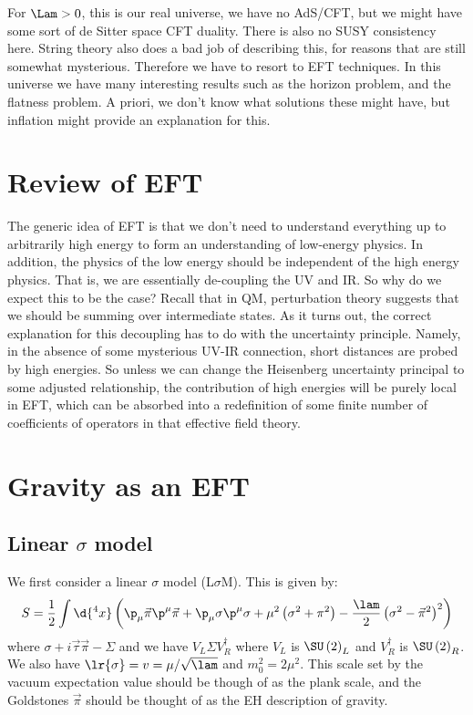 \documentclass{booc}
\begin{document}
For $\Lam > 0$, this is our real universe, we have no AdS/CFT, but we might have some sort
of de Sitter space CFT duality. There is also no SUSY consistency here. 
String theory also does a bad job of describing this, for reasons that are still
somewhat mysterious. 
Therefore we have to resort to EFT techniques. 
In this universe we have many interesting results such as
the horizon problem, and the flatness problem.
A priori, we don't know what solutions these might have, but inflation 
might provide an explanation for this.

\section{Review of EFT}

The generic idea of EFT is that we don't need to understand everything up to arbitrarily high energy
to form an understanding of low-energy physics. 
In addition, the physics of the low energy should be independent of the high energy physics. 
That is, we are essentially de-coupling the UV and IR. 
So why do we expect this to be the case?
Recall that in QM, perturbation theory suggests that we should be summing over intermediate 
states. 
As it turns out, the correct explanation for this decoupling has to do with the uncertainty
principle. Namely, in the absence of some mysterious UV-IR connection, 
short distances are probed by high energies. So unless we can change the Heisenberg 
uncertainty principal to some adjusted relationship, the contribution of high energies
will be purely local in EFT, which can be absorbed into a redefinition of some finite
number of coefficients of operators in that effective field theory. 

\section{Gravity as an EFT}

\subsection{Linear $\sigma$ model}

We first consider a linear $\sigma$ model (L$\sigma$M). This is given by:
\begin{equation}
S = \frac{1}{2} \int \d{^4 x} \left( \p_\mu \vec{\pi} \p^\mu \vec{\pi}
+\p_\mu \sigma\p^\mu \sigma + \mu^2\left( \sigma^2 + \pi^2 \right) - 
\frac{\lam}{2}\left( \sigma^2 - \vec{\pi}^2 \right)^2
\right)
\end{equation}
where $\sigma + i\vec{\tau} \vec{\pi} - \Sigma$
and we have $V_L\Sigma V_R^\dag$ where $V_L$ is $\SU\left( 2 \right)_L$
and $V_R^\dag$ is $\SU\left( 2 \right)_R$. 
We also have $\lr{\sigma} = v = \mu / \sqrt{\lam}$ and $m_0^2 = 2\mu^2$. 
This scale set by the vacuum expectation value should be though of as the plank scale, and the Goldstones
$\vec{\pi}$ should be thought of as the EH description of gravity.
\end{document}
